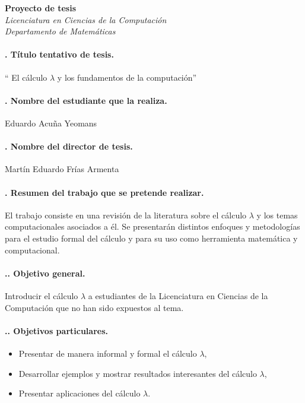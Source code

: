 \documentclass[12pt,letterpaper]{article}
\newcommand{\RomanNumeral}[1]{\uppercase\expandafter{\romannumeral #1\relax}}
\newcommand{\titulo}{Proyecto de tesis}
\newcommand{\tesis}{El cálculo \( λ \) y los fundamentos de la computación}
\newcommand{\estudiante}{Eduardo Acuña Yeomans}
\newcommand{\director}{Martín Eduardo Frías Armenta}
\begin{document}
\thispagestyle{empty}

\begin{center}
  \Huge{\textbf{\titulo}}\\
  \vspace*{10pt}
  \small{\emph{Licenciatura en Ciencias de la Computación}}\\
  \small{\emph{Departamento de Matemáticas}}
  \vspace*{25pt}
\end{center}

\paragraph{\RomanNumeral{1}. Título tentativo de tesis.} `` \tesis ''

\paragraph{\RomanNumeral{2}. Nombre del estudiante que la realiza.} \estudiante

\paragraph{\RomanNumeral{3}. Nombre del director de tesis.} \director

\paragraph{\RomanNumeral{4}. Resumen del trabajo que se pretende realizar.} El trabajo consiste en una revisión de la literatura sobre el cálculo \( λ \) y los temas computacionales asociados a él. Se presentarán distintos enfoques y metodologías para el estudio formal del cálculo y para su uso como herramienta matemática y computacional. 

\paragraph{\RomanNumeral{5}.\RomanNumeral{1}. Objetivo general.} Introducir el cálculo \( λ \) a estudiantes de la Licenciatura en Ciencias de la Computación que no han sido expuestos al tema.

\paragraph{\RomanNumeral{5}.\RomanNumeral{2}. Objetivos particulares.}
\begin{itemize}
\item Presentar de manera informal y formal el cálculo \( λ \),
\item Desarrollar ejemplos y mostrar resultados interesantes del cálculo \( λ \),
\item Presentar aplicaciones del cálculo \( λ \).
\end{itemize}
\end{document}

